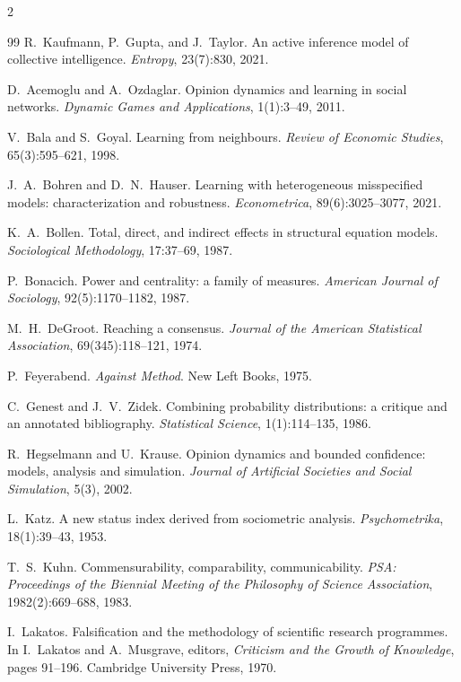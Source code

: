 \documentclass[11pt]{article}
\begin{document}
\begin{multicols}{2}
\begin{thebibliography}{99}
R.~Kaufmann, P.~Gupta, and J.~Taylor.
An active inference model of collective intelligence.
\emph{Entropy}, 23(7):830, 2021.

D.~Acemoglu and A.~Ozdaglar.
Opinion dynamics and learning in social networks.
\emph{Dynamic Games and Applications}, 1(1):3--49, 2011.

V.~Bala and S.~Goyal.
Learning from neighbours. \emph{Review of Economic Studies}, 65(3):595--621, 1998.

J.~A.~Bohren and D.~N.~Hauser.
Learning with heterogeneous misspecified models: characterization and robustness.
\emph{Econometrica}, 89(6):3025--3077, 2021.

K.~A.~Bollen.
Total, direct, and indirect effects in structural equation models.
\emph{Sociological Methodology}, 17:37--69, 1987.

P.~Bonacich.
Power and centrality: a family of measures.
\emph{American Journal of Sociology}, 92(5):1170--1182, 1987.

M.~H.~DeGroot.
Reaching a consensus. \emph{Journal of the American Statistical Association}, 69(345):118--121, 1974.

P.~Feyerabend.
\emph{Against Method}. New Left Books, 1975.

C.~Genest and J.~V.~Zidek.
Combining probability distributions: a critique and an annotated bibliography.
\emph{Statistical Science}, 1(1):114--135, 1986.

R.~Hegselmann and U.~Krause.
Opinion dynamics and bounded confidence: models, analysis and simulation.
\emph{Journal of Artificial Societies and Social Simulation}, 5(3), 2002.

L.~Katz.
A new status index derived from sociometric analysis. \emph{Psychometrika}, 18(1):39--43, 1953.

T.~S.~Kuhn.
Commensurability, comparability, communicability.
\emph{PSA: Proceedings of the Biennial Meeting of the Philosophy of Science Association},
1982(2):669--688, 1983.

I.~Lakatos.
Falsification and the methodology of scientific research programmes.
In I.~Lakatos and A.~Musgrave, editors, \emph{Criticism and the Growth of Knowledge},
pages 91--196. Cambridge University Press, 1970.


\end{thebibliography}
\end{multicols}
\end{document}
